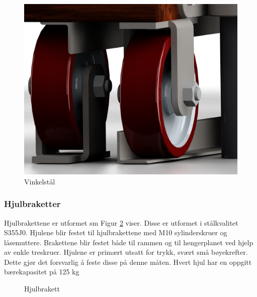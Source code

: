 \begin{figure}[H]
\centerline{\includegraphics [width=13cm]{images/9.png}}
\caption{Vinkelstål}
\label{F2}
\end{figure}

\subsubsection{Hjulbraketter}

Hjulbrakettene er utformet sm Figur \ref{F3} viser. Disse er utformet i stålkvalitet S355J0. 
Hjulene blir festet til hjulbrakettene med M10 sylinderskruer og låsemuttere. Brakettene blir festet både til rammen og til hengerplanet ved hjelp av enkle treskruer. Hjulene er primært utsatt for trykk, svært små bøyekrefter. Dette gjør det forsvarlig å feste disse på denne måten. Hvert hjul har en oppgitt bærekapasitet på 125 kg 

\begin{figure}[H]
\centering   
{}
\caption{Hjulbrakett}
\label{F3}
\end{figure}

